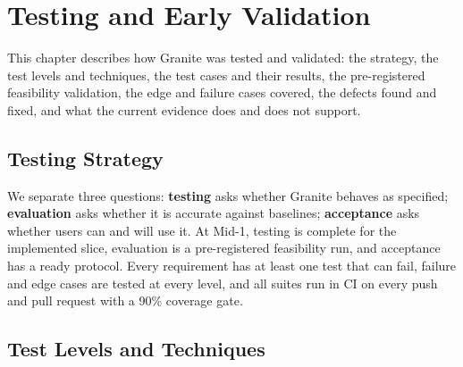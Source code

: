 \chapter{Testing and Early Validation}

This chapter describes how Granite was tested and validated: the strategy, the test levels and techniques, the test cases and their results, the pre-registered feasibility validation, the edge and failure cases covered, the defects found and fixed, and what the current evidence does and does not support.

\section{Testing Strategy}

We separate three questions: \textbf{testing} asks whether Granite behaves as specified; \textbf{evaluation} asks whether it is accurate against baselines; \textbf{acceptance} asks whether users can and will use it. At Mid-1, testing is complete for the implemented slice, evaluation is a pre-registered feasibility run, and acceptance has a ready protocol. Every requirement has at least one test that can fail, failure and edge cases are tested at every level, and all suites run in CI on every push and pull request with a 90\% coverage gate.

\section{Test Levels and Techniques}

